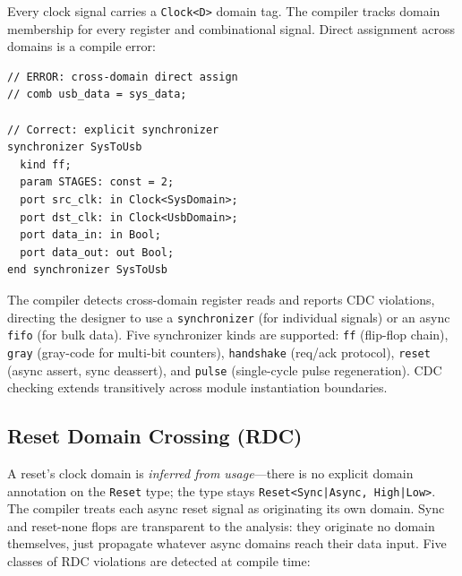 \documentclass[manuscript]{acmart}
\begin{document}
Every clock signal carries a \texttt{Clock<D>} domain tag. The compiler tracks domain membership for every register and combinational signal. Direct assignment across domains is a compile error:

\begin{lstlisting}[language=Arch,caption={Clock domain crossing via synchronizer},label={lst:cdc}]
// ERROR: cross-domain direct assign
// comb usb_data = sys_data;

// Correct: explicit synchronizer
synchronizer SysToUsb
  kind ff;
  param STAGES: const = 2;
  port src_clk: in Clock<SysDomain>;
  port dst_clk: in Clock<UsbDomain>;
  port data_in: in Bool;
  port data_out: out Bool;
end synchronizer SysToUsb
\end{lstlisting}

The compiler detects cross-domain register reads and reports CDC violations, directing the designer to use a \texttt{synchronizer} (for individual signals) or an async \texttt{fifo} (for bulk data). Five synchronizer kinds are supported: \texttt{ff} (flip-flop chain), \texttt{gray} (gray-code for multi-bit counters), \texttt{handshake} (req/ack protocol), \texttt{reset} (async assert, sync deassert), and \texttt{pulse} (single-cycle pulse regeneration). CDC checking extends transitively across module instantiation boundaries.

\subsection{Reset Domain Crossing (RDC)}
\label{sec:rdc}

A reset's clock domain is \emph{inferred from usage}---there is no explicit domain annotation on the \texttt{Reset} type; the type stays \texttt{Reset<Sync|Async, High|Low>}. The compiler treats each async reset signal as originating its own domain. Sync and reset-none flops are transparent to the analysis: they originate no domain themselves, just propagate whatever async domains reach their data input. Five classes of RDC violations are detected at compile time:
\end{document}
